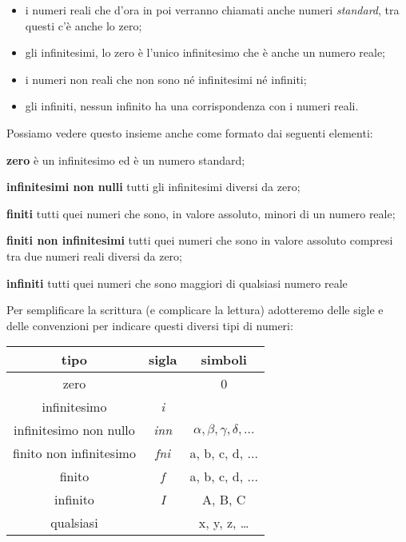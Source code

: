 \begin{itemize} [noitemsep]
 \item i numeri reali che d'ora in poi verranno chiamati anche numeri 
\emph{standard}, tra questi c'è anche lo zero;
 \item gli infinitesimi, lo zero è l'unico infinitesimo che è anche un numero 
reale;
 \item i numeri non reali che non sono né infinitesimi né infiniti;
 \item gli infiniti, nessun infinito ha una corrispondenza con i numeri reali.
\end{itemize}

Possiamo vedere questo insieme anche come formato dai seguenti elementi:

\begin{description} [noitemsep]
 \item \textbf{zero}
 è un infinitesimo ed è un numero standard;
 \item \textbf{infinitesimi non nulli}
 tutti gli infinitesimi diversi da zero;
 \item \textbf{finiti}
 tutti quei numeri che sono, in valore assoluto, minori di un numero reale;
 \item \textbf{finiti non infinitesimi}
 tutti quei numeri che sono in valore assoluto compresi tra due numeri reali 
 diversi da zero;
 \item \textbf{infiniti}
 tutti quei numeri che sono maggiori di qualsiasi numero reale

\end{description}
 
Per semplificare la scrittura (e complicare la lettura) adotteremo delle 
sigle 
e delle convenzioni per indicare questi diversi tipi di numeri:

\begin{center}
\begin{tabular}{ccc}\toprule
tipo & sigla & simboli\\\midrule
zero &  & 0\\
infinitesimo & \emph{i} & \\
infinitesimo non nullo & \emph{inn} & $\alpha, \beta, \gamma, \delta, \dots$\\
finito non infinitesimo& \emph{fni} & a, b, c, d, ...\\
finito & \emph{f} & a, b, c, d, ...\\
infinito & \emph{I} & A, B, C\\
qualsiasi &  & x, y, z, \ldots\\\bottomrule
\end{tabular}
\label{tab:insnum_tipi}
\end{center}

